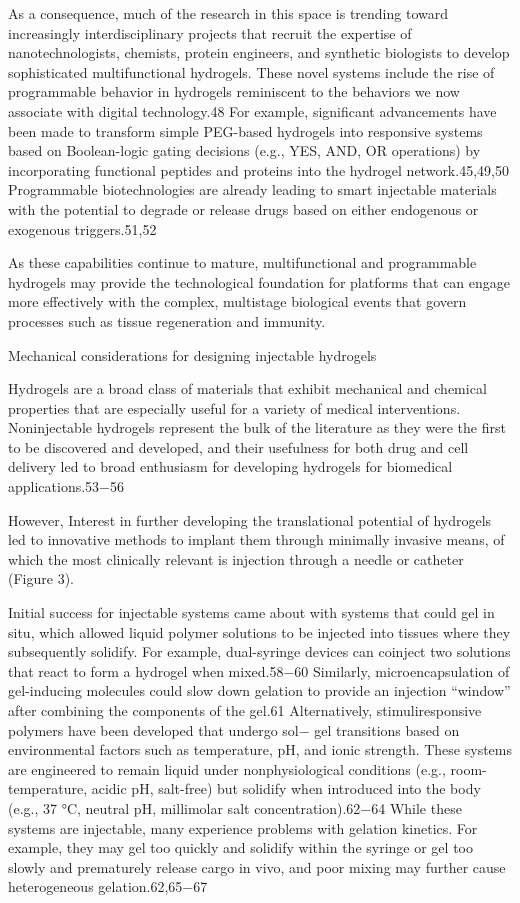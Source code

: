 \documentclass[../../main-notes.tex]{subfiles}
\begin{document}
As a consequence, much of the research in this space is trending toward increasingly interdisciplinary projects that recruit the expertise of nanotechnologists, chemists, protein engineers, and synthetic biologists to develop sophisticated multifunctional hydrogels. 
These novel systems include the rise of programmable behavior in hydrogels reminiscent to the behaviors we now  associate with digital technology.48 
For example, significant advancements have been made to transform simple PEG-based hydrogels into responsive systems based on Boolean-logic gating decisions (e.g., YES, AND, OR operations) by incorporating functional peptides and proteins into the  hydrogel network.45,49,50 
Programmable biotechnologies are already leading to smart injectable materials with the potential to degrade or release drugs based on either endogenous or  exogenous triggers.51,52 

As these capabilities continue to mature, multifunctional and programmable hydrogels may provide the technological foundation for platforms that can engage more effectively with the complex, multistage biological events that govern processes such as tissue regeneration and immunity.


Mechanical considerations for designing injectable hydrogels

Hydrogels are a broad class of materials that exhibit mechanical and chemical properties that are especially useful for a variety of medical interventions. 
Noninjectable hydrogels represent the bulk of the literature as they were the first to be discovered and developed, and their usefulness for both drug and cell delivery led to broad enthusiasm for developing hydrogels for biomedical applications.53−56  

However,   
Interest in further developing the translational potential of hydrogels led to innovative methods to implant them through minimally invasive means, of which the most clinically relevant is injection through a needle or catheter (Figure 3).  

Initial success for injectable systems came about with systems that could gel in situ, which allowed liquid polymer solutions to be injected into tissues where they subsequently solidify.  
For example, dual-syringe devices can coinject two  solutions that react to form a hydrogel when mixed.58−60  
Similarly, microencapsulation of gel-inducing molecules could slow down gelation to provide an injection “window” after  combining the components of the gel.61  
Alternatively, stimuliresponsive polymers have been developed that undergo sol− gel transitions based on environmental factors such as temperature, pH, and ionic strength.  
These systems are engineered to remain liquid under nonphysiological conditions (e.g., room-temperature, acidic pH, salt-free) but solidify when introduced into the body (e.g., 37 °C, neutral pH, millimolar  salt concentration).62−64  
While these systems are injectable, many experience problems with gelation kinetics.  
For example, they may gel too quickly and solidify within the syringe or gel too slowly and prematurely release cargo in vivo, and poor  mixing may further cause heterogeneous gelation.62,65−67
\end{document}
